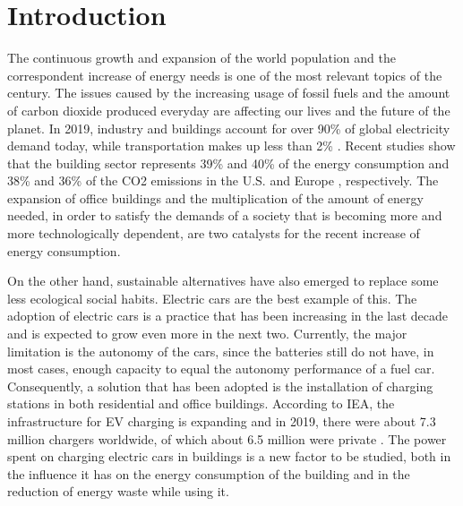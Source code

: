 \chapter{Introduction}
\label{chap:intro}

The continuous growth and expansion of the world population and the correspondent increase of energy needs is one of the most relevant topics of the century. The issues caused by the increasing usage of fossil fuels and the amount of carbon dioxide produced everyday are affecting our lives and the future of the planet. In 2019, industry and buildings account for over 90\% of global electricity demand today, while transportation makes up less than 2\% \cite{iea}. Recent studies show that the building sector represents 39\% and 40\% of the energy consumption and 38\% and 36\% of the CO2 emissions in the U.S. \cite{CivilUS} and Europe \cite{CivilEU}, respectively. The expansion of office buildings and the multiplication of the amount of energy needed, in order to satisfy the demands of a society that is becoming more and more technologically dependent, are two catalysts for the recent increase of energy consumption. 



On the other hand, sustainable alternatives have also emerged to replace some less ecological social habits. Electric cars are the best example of this. The adoption of electric cars is a practice that has been increasing in the last decade and is expected to grow even more in the next two. Currently, the major limitation is the autonomy of the cars, since the batteries still do not have, in most cases, enough capacity to equal the autonomy performance of a fuel car. Consequently, a solution that has been adopted is the installation of charging stations in both residential and office buildings. According to IEA, the infrastructure for \ac{EV} charging is expanding and in 2019, there were about 7.3 million chargers worldwide, of which about 6.5 million were private \cite{charger}. The power spent on charging electric cars in buildings is a new factor to be studied, both in the influence it has on the energy consumption of the building and in the reduction of energy waste while using it.


